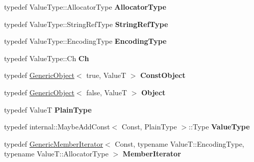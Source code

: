 \begin{DoxyCompactItemize}
\item 
typedef Value\+Type\+::\+Allocator\+Type {\bfseries Allocator\+Type}\hypertarget{class_generic_object_a00c8cee952d5ebadc5e1c309aa489ad9}{}\label{class_generic_object_a00c8cee952d5ebadc5e1c309aa489ad9}

\item 
typedef Value\+Type\+::\+String\+Ref\+Type {\bfseries String\+Ref\+Type}\hypertarget{class_generic_object_a9b8381fc96f5f89b2163b052ed66cc59}{}\label{class_generic_object_a9b8381fc96f5f89b2163b052ed66cc59}

\item 
typedef Value\+Type\+::\+Encoding\+Type {\bfseries Encoding\+Type}\hypertarget{class_generic_object_a96ebfdde095e2ce42535d15ae5dc58ef}{}\label{class_generic_object_a96ebfdde095e2ce42535d15ae5dc58ef}

\item 
typedef Value\+Type\+::\+Ch {\bfseries Ch}\hypertarget{class_generic_object_ac6747e5baa13e15bcea1658b5624647a}{}\label{class_generic_object_ac6747e5baa13e15bcea1658b5624647a}

\item 
typedef \hyperlink{class_generic_object}{Generic\+Object}$<$ true, ValueT $>$ {\bfseries Const\+Object}\hypertarget{class_generic_object_aeee588f9a85e88cac89b7c4dfb6b0bd3}{}\label{class_generic_object_aeee588f9a85e88cac89b7c4dfb6b0bd3}

\item 
typedef \hyperlink{class_generic_object}{Generic\+Object}$<$ false, ValueT $>$ {\bfseries Object}\hypertarget{class_generic_object_ae8f5673d0cf8e7ebfd2d4f6ab27b632d}{}\label{class_generic_object_ae8f5673d0cf8e7ebfd2d4f6ab27b632d}

\item 
typedef ValueT {\bfseries Plain\+Type}\hypertarget{class_generic_object_a4c25f4a5f696745c418b91ad9f577f12}{}\label{class_generic_object_a4c25f4a5f696745c418b91ad9f577f12}

\item 
typedef internal\+::\+Maybe\+Add\+Const$<$ Const, Plain\+Type $>$\+::Type {\bfseries Value\+Type}\hypertarget{class_generic_object_a930aa30f89caee7ba7bff60bf9dc21b1}{}\label{class_generic_object_a930aa30f89caee7ba7bff60bf9dc21b1}

\item 
typedef \hyperlink{class_generic_member_iterator}{Generic\+Member\+Iterator}$<$ Const, typename Value\+T\+::\+Encoding\+Type, typename Value\+T\+::\+Allocator\+Type $>$ {\bfseries Member\+Iterator}\hypertarget{class_generic_object_a1f531d70f8d57ed30199ac445b5935e6}{}\label{class_generic_object_a1f531d70f8d57ed30199ac445b5935e6}


\end{DoxyCompactItemize}
